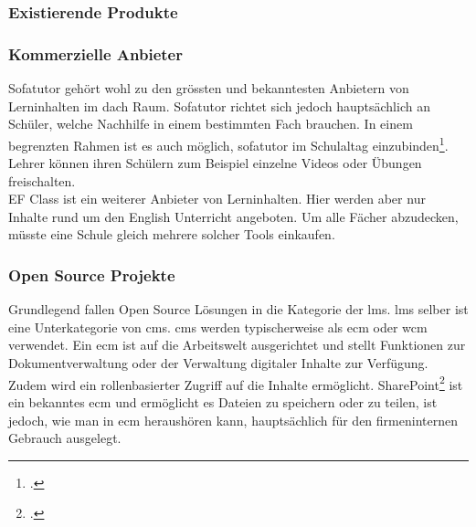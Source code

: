\subsubsection{Existierende Produkte}
\subsubsection*{Kommerzielle Anbieter}
Sofatutor gehört wohl zu den grössten und bekanntesten Anbietern von Lerninhalten im \gls{dach} Raum. Sofatutor richtet sich jedoch hauptsächlich an Schüler, welche Nachhilfe in einem bestimmten Fach brauchen. In einem begrenzten Rahmen ist es auch möglich, sofatutor im Schulaltag einzubinden\footcite{sofatutor_fuer_lehrer}. Lehrer können ihren Schülern zum Beispiel einzelne Videos oder Übungen freischalten. \\

EF Class ist ein weiterer Anbieter von Lerninhalten. Hier werden aber nur Inhalte rund um den English Unterricht angeboten. Um alle Fächer abzudecken, müsste eine Schule gleich mehrere solcher Tools einkaufen. \\


\subsubsection*{Open Source Projekte}
Grundlegend fallen Open Source Lösungen in die Kategorie der \gls{lms}. \gls{lms} selber ist eine Unterkategorie von \gls{cms}. \gls{cms} werden typischerweise als \gls{ecm} oder \gls{wcm} verwendet. Ein \gls{ecm} ist auf die Arbeitswelt ausgerichtet und stellt Funktionen zur Dokumentverwaltung oder der Verwaltung digitaler Inhalte zur Verfügung. Zudem wird ein rollenbasierter Zugriff auf die Inhalte ermöglicht. SharePoint\footcite{sharepoint} ist ein bekanntes \gls{ecm} und ermöglicht es Dateien zu speichern oder zu teilen, ist jedoch, wie man in \gls{ecm} heraushören kann, hauptsächlich für den firmeninternen Gebrauch ausgelegt. \\

